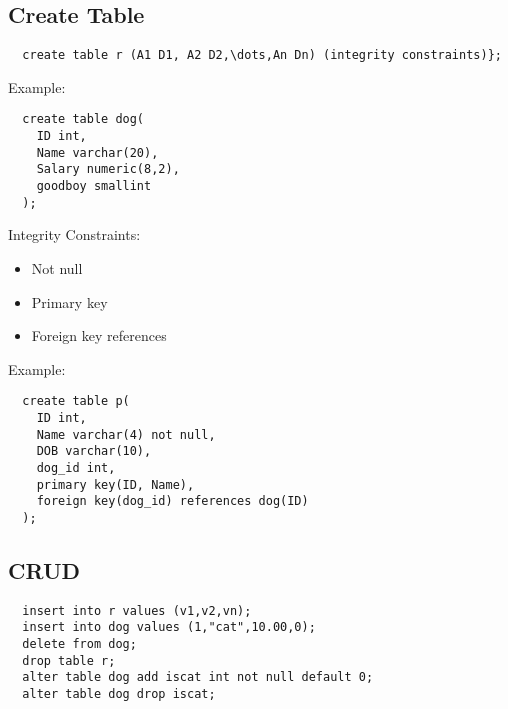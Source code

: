 \documentclass{math}
\begin{document}
\subsection*{Create Table}
\begin{lstlisting}
  create table r (A1 D1, A2 D2,\dots,An Dn) (integrity constraints)};
\end{lstlisting}
Example:
\begin{lstlisting}
  create table dog(
    ID int,
    Name varchar(20),
    Salary numeric(8,2),
    goodboy smallint
  );
\end{lstlisting}
Integrity Constraints:
\begin{itemize}
  \item Not null
  \item Primary key
  \item Foreign key references
\end{itemize}
Example:
\begin{lstlisting}
  create table p(
    ID int,
    Name varchar(4) not null,
    DOB varchar(10),
    dog_id int,
    primary key(ID, Name),
    foreign key(dog_id) references dog(ID)
  );
\end{lstlisting}

\subsection*{CRUD}
\begin{lstlisting}
  insert into r values (v1,v2,vn);
  insert into dog values (1,"cat",10.00,0);
  delete from dog;
  drop table r;
  alter table dog add iscat int not null default 0;
  alter table dog drop iscat;
\end{lstlisting}
\end{document}
